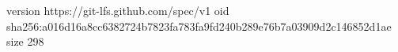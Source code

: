 version https://git-lfs.github.com/spec/v1
oid sha256:a016d16a8cc6382724b7823fa783fa9fd240b289e76b7a03909d2c146852d1ae
size 298
